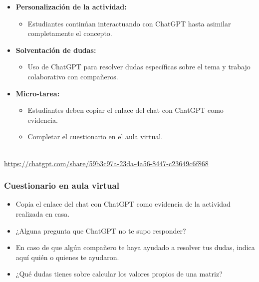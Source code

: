 \begin{frame}
    \begin{itemize}
        \item \textbf{Personalización de la actividad:}
        \begin{itemize}
            \item Estudiantes continúan interactuando con ChatGPT hasta asimilar completamente el concepto.
        \end{itemize}
        \item \textbf{Solventación de dudas:}
        \begin{itemize}
            \item Uso de ChatGPT para resolver dudas específicas sobre el tema y trabajo colaborativo con compañeros.
        \end{itemize}
        \item \textbf{Micro-tarea:}
        \begin{itemize}
            \item Estudiantes deben copiar el enlace del chat con ChatGPT como evidencia.
            \item Completar el cuestionario en el aula virtual.
        \end{itemize}
    \end{itemize}
\end{frame}

\begin{frame}
\centering
    \\
    {\footnotesize\url{https://chatgpt.com/share/59b3c97a-23da-4a56-8447-c23649c6f868}}
\end{frame}

\begin{frame}
\centering
\end{frame}

\begin{frame}
    \frametitle{Cuestionario en aula virtual}
    \begin{itemize}
        \item Copia el enlace del chat con ChatGPT como evidencia de la actividad realizada en casa.
        \item ¿Alguna pregunta que ChatGPT no te supo responder?
        \item En caso de que algún compañero te haya ayudado a resolver tus dudas, indica aquí quién o quienes te ayudaron.
        \item ¿Qué dudas tienes sobre calcular los valores propios de una matriz?
    \end{itemize}
\end{frame}

